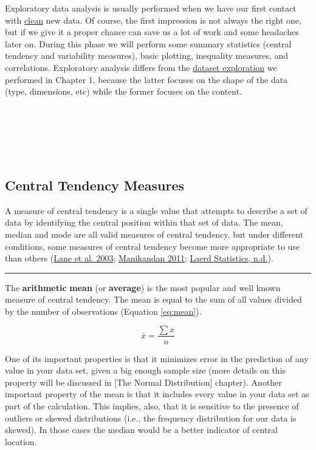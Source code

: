 \documentclass[
]{article}
\begin{document}
Exploratory data analysis is usually performed when we have our first
contact with \ul{clean} new data. Of course, the first
impression is not always the right one, but if we give it a proper
chance can save us a lot of work and some headaches later on. During
this phase we will perform some summary statistics (central tendency and
variability measures), basic plotting, inequality measures, and
correlations. Exploratory analysis differs from the \protect\hyperlink{dataset-exploration}{dataset
exploration} we performed in Chapter 1, because the latter focuses on
the shape of the data (type, dimensions, etc) while the former focuses
on the content.

~

~

~

\hypertarget{central-tendency-measures}{%
\subsection{Central Tendency Measures}\label{central-tendency-measures}}

A measure of central tendency is a single value that attempts to
describe a set of data by identifying the central position within that
set of data. The mean, median and mode are all valid measures of central
tendency, but under different conditions, some measures of central
tendency become more appropriate to use than others (\protect\hyperlink{ref-lane2003}{Lane et al. 2003}; \protect\hyperlink{ref-manikandan2011}{Manikandan 2011}; \protect\hyperlink{ref-laerdstatistics}{Laerd Statistics, n.d.}).

\begin{center}\rule{0.5\linewidth}{0.5pt}\end{center}

The \textbf{arithmetic} \textbf{mean} (or \textbf{average}) is the most popular and
well known measure of central tendency. The mean is equal to the sum of
all values divided by the number of observations (Equation
\eqref{eq:mean}).

\begin{equation}
\bar x = \frac{\sum{x}}{n}
\label{eq:mean}
\end{equation}

One of its important properties is that it minimizes error in the
prediction of any value in your data set, given a big enough sample size
(more details on this property will be discussed in {[}The Normal
Distribution{]} chapter). Another important property of the mean is that
it includes every value in your data set as part of the calculation.
This implies, also, that it is sensitive to the presence of outliers or
skewed distributions (i.e., the frequency distribution for our data is
skewed). In those cases the median would be a better indicator of
central location.
\end{document}
